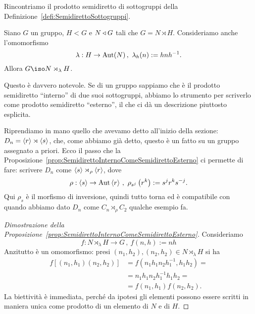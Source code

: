 Rincontriamo il prodotto semidiretto di sottogruppi della Definizione~\ref{defi:SemidirettoSottogruppi}.

\begin{prop}\label{prop:SemidirettoInternoComeSemidirettoEsterno}
Siano $G$ un gruppo, $H < G$ e $N \triangleleft G$ tali che $G = N \rtimes H$. Consideriamo anche l'omomorfismo
\[\lambda : H \to \mathrm{Aut}(N)\,,\ \lambda_h(n) := h n h^{-1} .\]
Allora $G \iso N \rtimes_\lambda H$.
\end{prop}

Questo è davvero notevole. Se di un gruppo sappiamo che è il prodotto semidiretto \enquote{interno} di due suoi sottogruppi, abbiamo lo strumento per scriverlo come prodotto semidiretto \enquote{esterno}, il che ci dà un descrizione piuttosto esplicita. 

\begin{esem}
Riprendiamo in mano quello che avevamo detto all'inizio della sezione: $D_n = \left\langle r\right\rangle \rtimes \left\langle s\right\rangle$, che, come abbiamo già detto, questo è un fatto su un gruppo assegnato a priori. Ecco il passo che la Proposizione~\ref{prop:SemidirettoInternoComeSemidirettoEsterno} ci permette di fare: scrivere $D_n$ come $\left\langle s\right\rangle \rtimes_\rho \left\langle r\right\rangle$, dove
\[\rho : \gen s \to \Aut \gen r \,,\ \rho_{s^j}\left(r^k\right) := s^j r^k s^{-j} .\]
Qui $\rho_s$ è il morfismo di inversione, quindi tutto torna ed è compatibile con quando abbiamo dato $D_n$ come $C_n \rtimes_\rho C_2$ qualche esempio fa.
\end{esem}

\begin{proof}[Dimostrazione della Proposizione~\ref{prop:SemidirettoInternoComeSemidirettoEsterno}]
Consideriamo
\[f : N \rtimes_\lambda H \to G\,,\ f(n, h) := nh\]
Anzitutto è un omomorfismo: presi $(n_1, h_2) , (n_2, h_2) \in N \rtimes_\lambda H$ si ha
\begin{align*}
f[(n_1, h_1) (n_2, h_2)] &= f\left(n_1 h_1 n_2 h_1^{-1}, h_1h_2\right) = \\
                         &= n_1 h_1 n_2 h_1^{-1} h_1 h_2 = \\
                         &= f(n_1, h_1) f(n_2, h_2) .
\end{align*}
La biettività è immediata, perché da ipotesi gli elementi possono essere scritti in maniera unica come prodotto di un elemento di $N$ e di $H$.
\end{proof}

